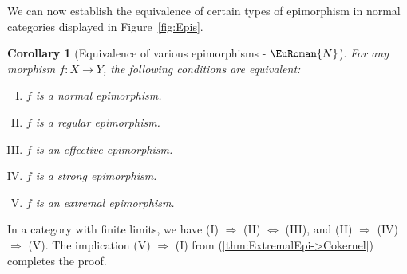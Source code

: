 \documentclass [12pt,oneside]{book}%
\makeatletter
\theoremstyle{captionstyle}  %
\newtheorem{corollary}[theorem]{Corollary}
\renewenvironment{proof}[1][\proofname]{\vspace{-2ex}\par       %
	\pushQED{\qed}%
	\normalfont \topsep6\p@\@plus6\p@\relax
	\trivlist
	\item[\hskip\labelsep
	            \color{proofcaption}\bfseries                %
	            #1\@addpunct{\quad}]\ignorespaces
}{%
	\popQED\endtrivlist\@endpefalse
}
\newenvironment{tfae}{		%
	\begin{enumerate}[(I)]}{
	\end{enumerate}
}
\newcommand{\To}{\Rightarrow}
\renewcommand{\implies}{\To}
\newcommand{\from}{\colon}				%
\newcommand{\NTag}{ - {\color{Brown} $\EuRoman{N}$}}																				%
\makeatother
\begin{document}
We can now establish the equivalence of certain types of epimorphism in normal categories displayed in Figure~\ref{fig:Epis}.

\begin{corollary}[Equivalence of various epimorphisms\NTag]
    \label{thm:CoKer=NormalEpi=RegEpi=EffectiveEpi}%
    For any morphism $ f\from{X\to Y}$, the following conditions are equivalent:
    \begin{tfae}
        \item $f$ is a normal epimorphism.
        \item $f$ is a regular epimorphism.
        \item $f$ is an effective epimorphism.
        \item $f$ is a strong epimorphism.
        \item $f$ is an extremal epimorphism.
    \end{tfae}
\end{corollary}
\begin{proof}
    In a category with finite limits, we have (I) $\implies$ (II) $\Leftrightarrow$ (III), and (II) $\implies$ (IV) $\implies$ (V). The implication (V) $\implies$ (I) from (\ref{thm:ExtremalEpi->Cokernel}) completes the proof.
\end{proof}
\end{document}
